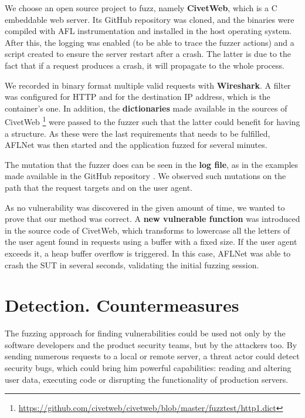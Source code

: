 \documentclass[10pt,a4paper,english,onecolumn]{IEEEtran}
\begin{document}
We choose an open source project to fuzz, namely \textbf{CivetWeb}, which is a C embeddable web server. Its GitHub repository was cloned, and the binaries were compiled with AFL instrumentation and installed in the host operating system. After this, the logging was enabled (to be able to trace the fuzzer actions) and a script created to ensure the server restart after a crash. The latter is due to the fact that if a request produces a crash, it will propagate to the whole process.

We recorded in binary format multiple valid requests with \textbf{Wireshark}. A filter was configured for HTTP and for the destination IP address, which is the container's one. In addition, the \textbf{dictionaries} made available in the sources of CivetWeb \footnote{\href{https://github.com/civetweb/civetweb/blob/master/fuzztest/http1.dict}{https://github.com/civetweb/civetweb/blob/master/fuzztest/http1.dict}} were passed to the fuzzer such that the latter could benefit for having a structure. As these were the last requirements that needs to be fulfilled, AFLNet was then started and the application fuzzed for several minutes.

The mutation that the fuzzer does can be seen in the \textbf{log file}, as in the examples made available in the GitHub repository \cite{project_repo}. We observed such mutations on the path that the request targets and on the user agent.

As no vulnerability was discovered in the given amount of time, we wanted to prove that our method was correct. A \textbf{new vulnerable function} was introduced in the source code of CivetWeb, which transforms to lowercase all the letters of the user agent found in requests using a buffer with a fixed size. If the user agent exceeds it, a heap buffer overflow is triggered. In this case, AFLNet was able to crash the SUT in several seconds, validating the initial fuzzing session.

\section{Detection. Countermeasures}

The fuzzing approach for finding vulnerabilities could be used not only by the software developers and the
product security teams, but by the attackers too. By sending numerous requests to a local or remote server, a threat actor could detect security bugs, which could bring him powerful capabilities: reading and altering user data, executing code or disrupting the functionality of production servers.
\end{document}
